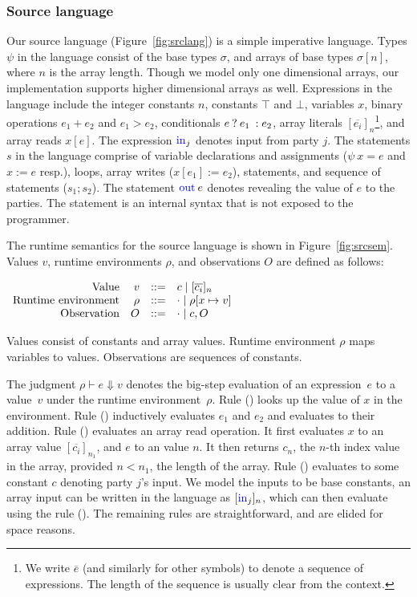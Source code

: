 \subsubsection*{Source language}Our source language
(Figure~\ref{fig:srclang}) is a simple imperative language. Types
$\psi$ in the language consist of the base types $\sigma$, and arrays
of base types $\sigma[n]$, where $n$ is the array length. Though we
model only one dimensional arrays, our implementation supports higher
dimensional arrays as well. Expressions in the language include the
integer constants $n$,  constants $\top$ and $\bot$,
variables $x$, binary operations $e_{1} + e_{2}$ and $e_{1} > e_{2}$,
conditionals ${{e}\:?\:{e_{1}}\::{e_{2}}}$, array literals 
$[\overline{e_{i}}]_{n}$\footnote{We write $\overline{e}$ (and
  similarly for other symbols) to denote a sequence of expressions.
The length of the sequence is usually clear from the context.}, and
array reads $x[e]$. The expression $\kw{in}_{j}$ denotes input from
party $j$. The statements $s$ in the language comprise of variable
declarations and assignments ($\psi\:x = e$ and $x := e$ resp.),
 loops, array writes ($x[e_{1}] := e_{2}$), 
statements, and sequence of statements ($s_{1}; s_{2}$). The statement
$\kw{out}\:e$ denotes revealing the value of $e$ to the
parties. The  statement is an internal syntax that is not
exposed to the programmer.

The runtime semantics for the source language is shown in
Figure~\ref{fig:srcsem}. Values $v$, runtime environments $\rho$, and
observations $O$ are defined as follows:

\vspace{0.2cm}
$
\small
\begin{array}{rrcl}
    \ftext{Value} & v &::=& c \mid [\overline{c_{i}}]_{n}\\
    \ftext{Runtime environment} & \rho &::=& \cdot \mid \rho[x \mapsto v]\\
    \ftext{Observation} & O & ::= & \cdot \mid c, O \\
\end{array}
$

\vspace{0.2cm}
Values consist of constants and array values. Runtime environment
$\rho$ maps variables to values. Observations are sequences of
constants.

The judgment $\rho \vdash e \Downarrow v$ denotes the big-step
evaluation of an expression~$e$ to a value~$v$ under the runtime
environment~$\rho$. Rule ({}) looks up the value of $x$ in
the environment. Rule ({}) inductively evaluates $e_{1}$ and
$e_{2}$ and evaluates to their addition. Rule ({})
evaluates an array read operation. It first evaluates $x$ to an array
value $[\overline{c_{i}}]_{n_{1}}$, and $e$ to an  value
$n$. It then returns $c_{n}$, the $n$-th index value in the array,
provided $n < n_{1}$, the length of the array. Rule ({})
evaluates to some constant $c$ denoting party $j$'s input. We model
the inputs to be base constants, an array input can be written in the
language as $[\kw{in}_{j}]_{n}$, which can then evaluate using the
rule ({}). The remaining rules are straightforward, and are
elided for space reasons.

